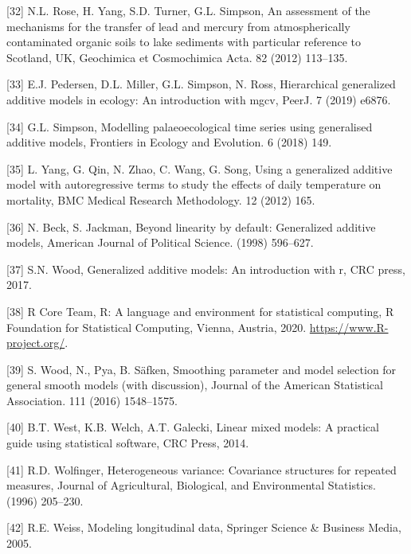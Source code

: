 \documentclass[
]{article}
\begin{document}
\leavevmode\hypertarget{ref-rose2012}{}%
{[}32{]} N.L. Rose, H. Yang, S.D. Turner, G.L. Simpson, An assessment of the mechanisms for the transfer of lead and mercury from atmospherically contaminated organic soils to lake sediments with particular reference to Scotland, UK, Geochimica et Cosmochimica Acta. 82 (2012) 113--135.

\leavevmode\hypertarget{ref-pedersen2019}{}%
{[}33{]} E.J. Pedersen, D.L. Miller, G.L. Simpson, N. Ross, Hierarchical generalized additive models in ecology: An introduction with mgcv, PeerJ. 7 (2019) e6876.

\leavevmode\hypertarget{ref-simpson2018}{}%
{[}34{]} G.L. Simpson, Modelling palaeoecological time series using generalised additive models, Frontiers in Ecology and Evolution. 6 (2018) 149.

\leavevmode\hypertarget{ref-yang2012}{}%
{[}35{]} L. Yang, G. Qin, N. Zhao, C. Wang, G. Song, Using a generalized additive model with autoregressive terms to study the effects of daily temperature on mortality, BMC Medical Research Methodology. 12 (2012) 165.

\leavevmode\hypertarget{ref-beck1998}{}%
{[}36{]} N. Beck, S. Jackman, Beyond linearity by default: Generalized additive models, American Journal of Political Science. (1998) 596--627.

\leavevmode\hypertarget{ref-wood2017}{}%
{[}37{]} S.N. Wood, Generalized additive models: An introduction with r, CRC press, 2017.

\leavevmode\hypertarget{ref-r}{}%
{[}38{]} R Core Team, R: A language and environment for statistical computing, R Foundation for Statistical Computing, Vienna, Austria, 2020. \url{https://www.R-project.org/}.

\leavevmode\hypertarget{ref-wood2016}{}%
{[}39{]} S. Wood, N., Pya, B. Säfken, Smoothing parameter and model selection for general smooth models (with discussion), Journal of the American Statistical Association. 111 (2016) 1548--1575.

\leavevmode\hypertarget{ref-west2014}{}%
{[}40{]} B.T. West, K.B. Welch, A.T. Galecki, Linear mixed models: A practical guide using statistical software, CRC Press, 2014.

\leavevmode\hypertarget{ref-wolfinger1996}{}%
{[}41{]} R.D. Wolfinger, Heterogeneous variance: Covariance structures for repeated measures, Journal of Agricultural, Biological, and Environmental Statistics. (1996) 205--230.

\leavevmode\hypertarget{ref-weiss2005}{}%
{[}42{]} R.E. Weiss, Modeling longitudinal data, Springer Science \& Business Media, 2005.
\end{document}
